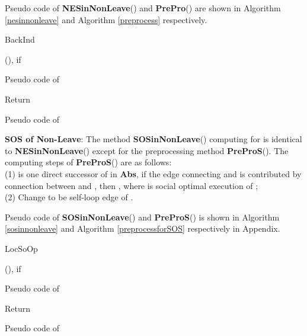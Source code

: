 \documentclass{acm_proc_article-sp}
\begin{document}
Pseudo code of \textbf{NESinNonLeave}() and \textbf{PrePro}() are shown in Algorithm \ref{nesinnonleave} and Algorithm \ref{preprocess} respectively.
\begin{algorithm}[!h]
\scriptsize
 \KwData{: }
 \;
 {
 \begin{bf}BackInd\end{bf}(), if \;
 }
 \caption{Pseudo code of }
 \label{nesinnonleave}
\end{algorithm}

\begin{algorithm}[!h]
\scriptsize
 \KwData{: }
 \;
 \;
 Return \;
 \caption{Pseudo code of }
 \label{preprocess}
\end{algorithm}
\textbf{SOS of Non-Leave}: The method \textbf{SOSinNonLeave}() computing  for   is identical to \textbf{NESinNonLeave}() except for the preprocessing method \textbf{PreProS}(). The computing steps of \textbf{PreProS}() are as follows: \\
(1)  is one direct successor of  in \textbf{Abs}, if the edge  connecting  and  is contributed by connection between  and , then , where  is social optimal execution of ;\\
(2) Change  to be self-loop edge of .

Pseudo code of \textbf{SOSinNonLeave}() and \textbf{PreProS}() is shown in Algorithm \ref{sosinnonleave} and Algorithm \ref{preprocessforSOS} respectively in Appendix.
\begin{algorithm}[!h]
\scriptsize
 \KwData{: }
 \;
 {
 \begin{bf}LocSoOp\end{bf}(), if \;
 }
 \caption{Pseudo code of }
 \label{sosinnonleave}
\end{algorithm}
\begin{algorithm}[!h]
\scriptsize
 \KwData{: }
 \;
 \;
 Return \;
 \caption{Pseudo code of }
 \label{preprocessforSOS}
\end{algorithm}
\end{document}
